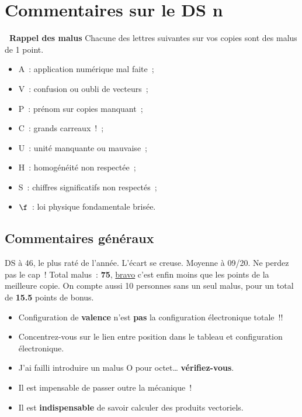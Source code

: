 \documentclass[a4paper, 10pt, final, garamond]{book}
\begin{document}
\setcounter{chapter}{5}

\chapter{Commentaires sur le DS n}

\begin{NCprop}[width=\linewidth]{\centering\bfseries\ Rappel des malus}
    Chacune des lettres suivantes sur vos copies sont des malus de \num{1}
    point.\smallbreak
    \begin{minipage}{0.50\linewidth}
        \begin{itemize}
            \item A~: application numérique mal faite~;
            \item V~: confusion ou oubli de vecteurs~;
            \item P~: prénom sur copies manquant~;
            \item C~: grands carreaux~!~;
        \end{itemize}
    \end{minipage}
    \begin{minipage}{0.50\linewidth}
        \begin{itemize}
            \item U~: unité manquante ou mauvaise~;
            \item H~: homogénéité non respectée~;
            \item S~: chiffres significatifs non respectés~;
            \item $\f$~: loi physique fondamentale brisée.
        \end{itemize}
    \end{minipage}
\end{NCprop}

\section{Commentaires généraux}

DS à 46, le plus raté de l'année. L'écart se creuse. Moyenne à 09/20. Ne perdez
pas le cap~! Total malus~: \textbf{75}, \underline{bravo} c'est enfin moins que
les points de la meilleure copie. On compte aussi 10 personnes sans un seul
malus, pour un total de \textbf{15.5} points de bonus.

\begin{itemize}
    \item Configuration de \textbf{valence} n'est \textbf{pas} la configuration
        électronique totale~!!
    \item Concentrez-vous sur le lien entre position dans le tableau et
        configuration électronique.
    \item J'ai failli introduire un malus O pour octet… \textbf{vérifiez-vous}.
    \item Il est impensable de passer outre la mécanique~!
    \item Il est \textbf{indispensable} de savoir calculer des produits
        vectoriels.
\end{itemize}
\end{document}
